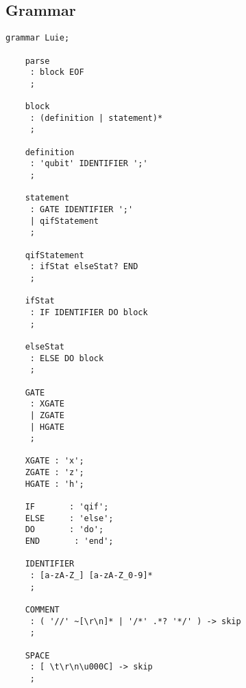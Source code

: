 \begin{appendices}

\section{Grammar}
\label{appendix:grammar}
\begin{lstlisting}[style=ANTLR]
    grammar Luie;
    
    parse
     : block EOF
     ;
    
    block
     : (definition | statement)*
     ;
    
    definition
     : 'qubit' IDENTIFIER ';'
     ;
    
    statement
     : GATE IDENTIFIER ';'
     | qifStatement 
     ;
    
    qifStatement
     : ifStat elseStat? END
     ;
     
    ifStat
     : IF IDENTIFIER DO block
     ;
    
    elseStat
     : ELSE DO block
     ;
    
    GATE
     : XGATE
     | ZGATE
     | HGATE
     ;
    
    XGATE : 'x';
    ZGATE : 'z';
    HGATE : 'h';
    
    IF       : 'qif';
    ELSE     : 'else';
    DO       : 'do';
    END       : 'end';
    
    IDENTIFIER 
     : [a-zA-Z_] [a-zA-Z_0-9]*
     ;
    
    COMMENT
     : ( '//' ~[\r\n]* | '/*' .*? '*/' ) -> skip
     ;
    
    SPACE
     : [ \t\r\n\u000C] -> skip
     ;
\end{lstlisting}

\end{appendices}